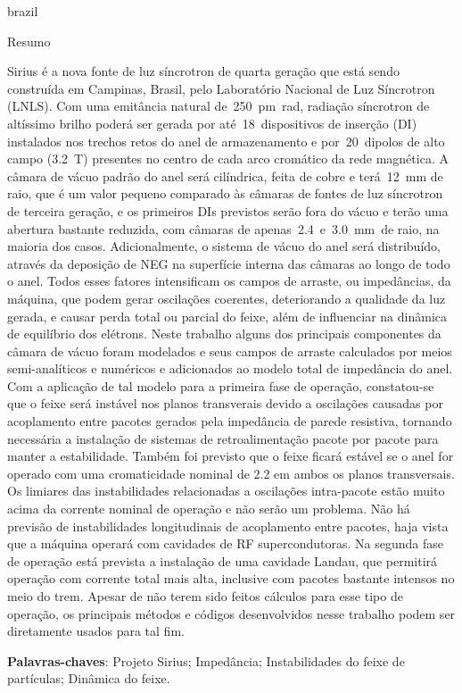 \begin{otherlanguage*}{brazil}
    \begin{center}{\ABNTEXchapterfont\huge Resumo}\end{center}
    Sirius é a nova fonte de luz síncrotron de quarta geração que está sendo construída em Campinas, Brasil, pelo Laboratório Nacional de Luz Síncrotron (LNLS). Com uma emitância natural de~\SI{250}{\pico\meter\radian}, radiação síncrotron de altíssimo brilho poderá ser gerada por até~\num{18}~dispositivos de inserção (DI) instalados nos trechos retos do anel de armazenamento e por~\si{20}~dipolos de alto campo (\SI{3.2}{\tesla}) presentes no centro de cada arco cromático da rede magnética. A câmara de vácuo padrão do anel será cilíndrica, feita de cobre e terá~\SI{12}{\milli\meter} de raio, que é um valor pequeno comparado às câmaras de fontes de luz síncrotron de terceira geração, e os primeiros DIs previstos serão fora do vácuo e terão uma abertura bastante reduzida, com câmaras de apenas~\num{2.4}~e~\SI{3.0}{\milli\meter}~de raio, na maioria dos casos. Adicionalmente, o sistema de vácuo do anel será distribuído, através da deposição de NEG na superfície interna das câmaras ao longo de todo o anel. Todos esses fatores intensificam os campos de arraste, ou impedâncias, da máquina, que podem gerar oscilações coerentes, deteriorando a qualidade da luz gerada, e causar perda total ou parcial do feixe, além de influenciar na dinâmica de equilíbrio dos elétrons. Neste trabalho alguns dos principais componentes da câmara de vácuo foram modelados e seus campos de arraste calculados por meios semi-analíticos e numéricos e adicionados ao modelo total de impedância do anel. Com a aplicação de tal modelo para a primeira fase de operação, constatou-se que o feixe será instável nos planos transverais devido a oscilações causadas por acoplamento entre pacotes gerados pela impedância de parede resistiva, tornando necessária a instalação de sistemas de retroalimentação pacote por pacote para manter a estabilidade. Também foi previsto que o feixe ficará estável se o anel for operado com uma cromaticidade nominal de \num{2.2} em ambos os planos transversais. Os limiares das instabilidades relacionadas a oscilações intra-pacote estão muito acima da corrente nominal de operação e não serão um problema. Não há previsão de instabilidades longitudinais de acoplamento entre pacotes, haja vista que a máquina operará com cavidades de RF supercondutoras. Na segunda fase de operação está prevista a instalação de uma cavidade Landau, que permitirá operação com corrente total mais alta, inclusive com pacotes bastante intensos no meio do trem. Apesar de não terem sido feitos cálculos para esse tipo de operação, os principais métodos e códigos desenvolvidos nesse trabalho podem ser diretamente usados para tal fim.

    \vspace{\onelineskip}
    \noindent\textbf{Palavras-chaves}: Projeto Sirius; Impedância; Instabilidades do feixe de partículas; Dinâmica do feixe.
    \vspace{\fill}
\end{otherlanguage*}
\cleardoublepage


